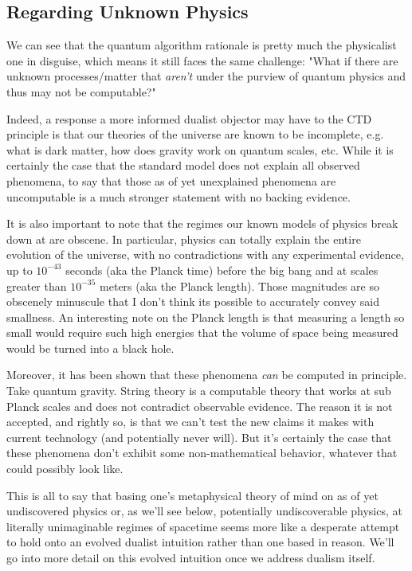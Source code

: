 \documentclass[11pt]{diazessay} %
\begin{document}
	\subsection{Regarding Unknown Physics}
		We can see that the quantum algorithm rationale is pretty much the physicalist one in disguise, which means it still faces the same challenge: "What if there are unknown processes/matter that \emph{aren't} under the purview of quantum physics and thus may not be computable?"

		Indeed, a response a more informed dualist objector may have to the CTD principle is that our theories of the universe are known to be incomplete, e.g. what is dark matter, how does gravity work on quantum scales, etc. While it is certainly the case that the standard model does not explain all observed phenomena, to say that those as of yet unexplained phenomena are uncomputable is a much stronger statement with no backing evidence.

		It is also important to note that the regimes our known models of physics break down at are obscene. In particular, physics can totally explain the entire evolution of the universe, with no contradictions with any experimental evidence, up to $10^{-43}$ seconds (aka the Planck time) before the big bang and at scales greater than $10^{-35}$ meters (aka the Planck length). Those magnitudes are so obscenely minuscule that I don't think its possible to accurately convey said smallness. An interesting note on the Planck length is that measuring a length so small would require such high energies that the volume of space being measured would be turned into a black hole.
		
		Moreover, it has been shown that these phenomena \emph{can} be computed in principle. Take quantum gravity. String theory is a computable theory that works at sub Planck scales and does not contradict observable evidence. The reason it is not accepted, and rightly so, is that we can't test the new claims it makes with current technology (and potentially never will). But it's certainly the case that these phenomena don't exhibit some non-mathematical behavior, whatever that could possibly look like.

		This is all to say that basing one's metaphysical theory of mind on as of yet undiscovered physics or, as we'll see below, potentially undiscoverable physics, at literally unimaginable regimes of spacetime seems more like a desperate attempt to hold onto an evolved dualist intuition rather than one based in reason. We'll go into more detail on this evolved intuition once we address dualism itself.
\end{document}
